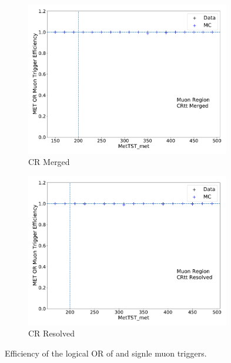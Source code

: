 \begin{figure}[tb]
  \centering
     \begin{subfigure}{0.49\textwidth}
     \includegraphics[width = 0.98\textwidth]{Figures/4/trig/trig_OR/CRtt Merged/MetTST_met.pdf}
     \caption{\ttbar CR Merged}
     \end{subfigure}
     \begin{subfigure}{0.49\textwidth}
     \includegraphics[width = 0.98\textwidth]{Figures/4/trig/trig_OR/CRtt Resolved/MetTST_met.pdf}
     \caption{\ttbar CR Resolved}
     \end{subfigure}
  \caption{Efficiency of the logical OR of \met and signle muon triggers.}
  \label{fig:trig_OR}
\end{figure}
